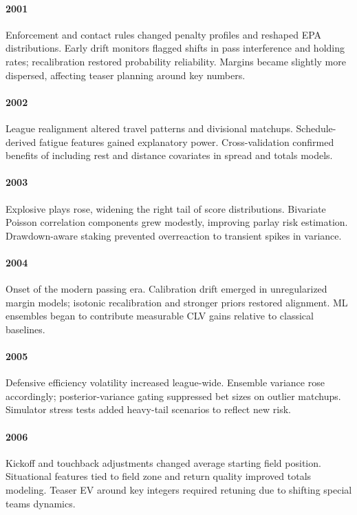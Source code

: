\documentclass[12pt]{report}  %
\numberwithin{equation}{section}
\theoremstyle{plain}
\theoremstyle{definition}
\theoremstyle{remark}
\begin{document}
\paragraph{2001} Enforcement and contact rules changed penalty profiles and reshaped EPA distributions. Early drift monitors flagged shifts in pass interference and holding rates; recalibration restored probability reliability. Margins became slightly more dispersed, affecting teaser planning around key numbers.

\paragraph{2002} League realignment altered travel patterns and divisional matchups. Schedule-derived fatigue features gained explanatory power. Cross-validation confirmed benefits of including rest and distance covariates in spread and totals models.

\paragraph{2003} Explosive plays rose, widening the right tail of score distributions. Bivariate Poisson correlation components grew modestly, improving parlay risk estimation. Drawdown-aware staking prevented overreaction to transient spikes in variance.

\paragraph{2004} Onset of the modern passing era. Calibration drift emerged in unregularized margin models; isotonic recalibration and stronger priors restored alignment. ML ensembles began to contribute measurable CLV gains relative to classical baselines.

\paragraph{2005} Defensive efficiency volatility increased league-wide. Ensemble variance rose accordingly; posterior-variance gating suppressed bet sizes on outlier matchups. Simulator stress tests added heavy-tail scenarios to reflect new risk.

\paragraph{2006} Kickoff and touchback adjustments changed average starting field position. Situational features tied to field zone and return quality improved totals modeling. Teaser EV around key integers required retuning due to shifting special teams dynamics.
\end{document}
